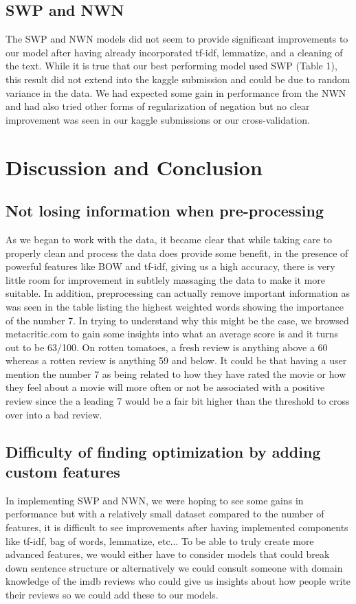 \documentclass{amsart}
\theoremstyle{definition}
\theoremstyle{remark}
\numberwithin{equation}{section}
\begin{document}
\subsection{SWP and NWN}
The SWP and NWN models did not seem to provide significant improvements to our model after having already incorporated tf-idf, lemmatize, and a cleaning of the text.  While it is true that our best performing model used SWP (Table 1), this result did not extend into the kaggle submission and could be due to random variance in the data.  We had expected some gain in performance from the NWN and had also tried other forms of regularization of negation but no clear improvement was seen in our kaggle submissions or our cross-validation.  
\section{Discussion and Conclusion}
\subsection{Not losing information when pre-processing}
As we began to work with the data, it became clear that while taking care to properly clean and process the data does provide some benefit, in the presence of powerful features like BOW and tf-idf, giving us a high accuracy, there is very little room for improvement in subtlely massaging the data to make it more suitable.  In addition, preprocessing can actually remove important information as was seen in the table listing the highest weighted words showing the importance of the number 7.  In trying to understand why this might be the case, we browsed metacritic.com to gain some insights into what an average score is and it turns out to be 63/100.  On rotten tomatoes, a fresh review is anything above a 60 whereas a rotten review is anything 59 and below.  It could be that having a user mention the number 7 as being related to how they have rated the movie or how they feel about a movie will more often or not be associated with a positive review since the a leading 7 would be a fair bit higher than the threshold to cross over into a bad review.
\subsection{Difficulty of finding optimization by adding custom features}
In implementing SWP and NWN, we were hoping to see some gains in performance but with a relatively small dataset compared to the number of features, it is difficult to see improvements after having implemented components like tf-idf, bag of words, lemmatize, etc...  To be able to truly create more advanced features, we would either have to consider models that could break down sentence structure or alternatively we could consult someone with domain knowledge of the imdb reviews who could give us insights about how people write their reviews so we could add these to our models.  
\end{document}
